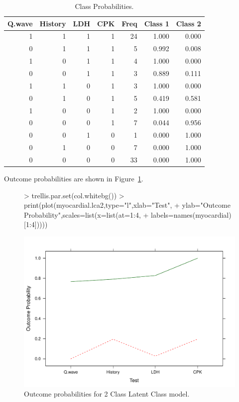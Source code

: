 \begin{table}[ht]
\centering
\begin{tabular}{rrrrrrr}
  \hline
Q.wave & History & LDH & CPK & Freq & Class 1 & Class 2 \\ 
  \hline
1 & 1 & 1 & 1 & 24 & 1.000 & 0.000 \\ 
  0 & 1 & 1 & 1 & 5 & 0.992 & 0.008 \\ 
  1 & 0 & 1 & 1 & 4 & 1.000 & 0.000 \\ 
  0 & 0 & 1 & 1 & 3 & 0.889 & 0.111 \\ 
  1 & 1 & 0 & 1 & 3 & 1.000 & 0.000 \\ 
  0 & 1 & 0 & 1 & 5 & 0.419 & 0.581 \\ 
  1 & 0 & 0 & 1 & 2 & 1.000 & 0.000 \\ 
  0 & 0 & 0 & 1 & 7 & 0.044 & 0.956 \\ 
  0 & 0 & 1 & 0 & 1 & 0.000 & 1.000 \\ 
  0 & 1 & 0 & 0 & 7 & 0.000 & 1.000 \\ 
  0 & 0 & 0 & 0 & 33 & 0.000 & 1.000 \\ 
   \hline
\end{tabular}
\caption{Class Probabilities.} 
\label{tab:classprob1}
\end{table}

Outcome probabilities are shown in Figure~\ref{fig:outcome2a}.

\begin{figure}
  \centering
\begin{Schunk}
\begin{Sinput}
> trellis.par.set(col.whitebg())
> print(plot(myocardial.lca2,type="l",xlab="Test",
+   ylab="Outcome Probability",scales=list(x=list(at=1:4,
+   labels=names(myocardial)[1:4]))))
\end{Sinput}
\end{Schunk}
\includegraphics{randomLCA-example-010}
  \caption{Outcome probabilities for 2 Class Latent Class model.}
  \label{fig:outcome2a}
\end{figure}



